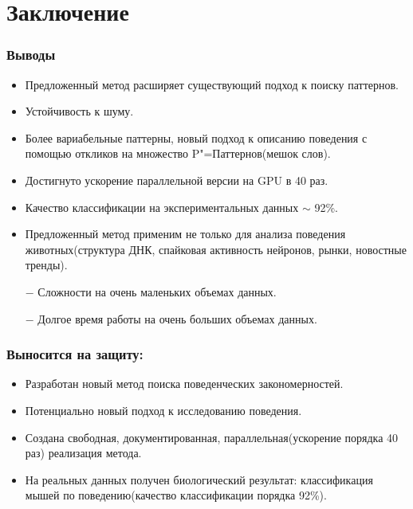 \documentclass[smaller]{beamer}
\begin{document}
\section{Заключение}
\begin{frame}
  \frametitle{Выводы}
  \begin{itemize}
   \item Предложенный метод расширяет существующий подход
	  к поиску паттернов.
   \item Устойчивость к шуму.
   \item Более вариабельные паттерны, новый подход к описанию поведения с помощью откликов на множество P"=Паттернов(мешок слов).
   \item Достигнуто ускорение параллельной версии на GPU в 40 раз.
   \item Качество классификации на экспериментальных данных $\sim$ 92\%.
   \item Предложенный метод применим не только для анализа поведения животных(структура ДНК, спайковая активность нейронов, рынки, новостные тренды).

\item[$-$] Сложности на очень маленьких объемах данных.
\item[$-$] Долгое время работы на очень больших объемах данных.
  \end{itemize}
\end{frame}

\begin{frame}
  \frametitle{Выносится на защиту:}
  \begin{itemize}
   \item Разработан новый метод поиска поведенческих закономерностей.
   \item Потенциально новый подход к исследованию поведения.
   \item Создана свободная, документированная, параллельная(ускорение порядка 40 раз) реализация метода.
   \item На реальных данных получен биологический результат: классификация мышей по поведению(качество классификации порядка 92\%).
  \end{itemize}
\end{frame}
\end{document}
